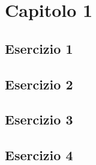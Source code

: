 \section{\textbf{Capitolo 1}}
\subsection{Esercizio 1}

\newpage
\subsection{Esercizio 2}

\newpage
\subsection{Esercizio 3}

\newpage
\subsection{Esercizio 4}

\newpage
